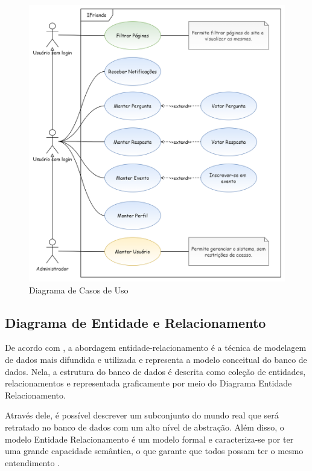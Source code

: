 \begin{figure}[htb]
\centering
\caption{Diagrama de Casos de Uso}
\label{diagrama_CasosUso}
\includegraphics[width=1.0\textwidth]{anexos/Imagens_Diagramas/CasosDeUso_IFriends.png}
\end{figure}
\FloatBarrier



\subsection{Diagrama de Entidade e Relacionamento}

De acordo com , a abordagem entidade-relacionamento é a técnica de modelagem de dados mais difundida e utilizada e representa a modelo conceitual do banco de dados. Nela, a estrutura do banco de dados é descrita como coleção de entidades, relacionamentos e representada graficamente por meio do Diagrama Entidade Relacionamento.

Através dele, é possível descrever um subconjunto do mundo real que será retratado no banco de dados com um alto nível de abstração. Além disso, o modelo Entidade Relacionamento é um modelo formal e caracteriza-se por ter uma grande capacidade semântica, o que garante que todos possam ter o mesmo entendimento \cite{leal2015linguagem}.

